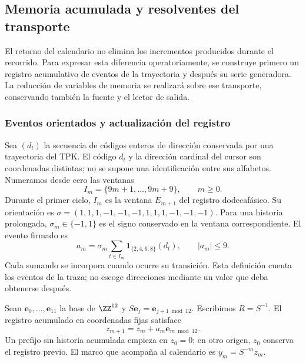 \subsection{Memoria acumulada y resolventes del transporte}
\label{subsec:memoria-resolvente}

El retorno del calendario no elimina los incrementos producidos durante
el recorrido. Para expresar esta diferencia operatoriamente, se construye
primero un registro acumulativo de eventos de la trayectoria y después su
serie generadora. La reducción de variables de memoria se realizará sobre
ese transporte, conservando también la fuente y el lector de salida.

\subsubsection{Eventos orientados y actualización del registro}

Sea \((d_t)\) la secuencia de códigos enteros de dirección conservada
por una trayectoria del TPK. El código \(d_t\) y la dirección cardinal
del cursor son coordenadas distintas; no se supone una identificación
entre sus alfabetos. Numeramos desde cero las ventanas
\[
 I_m=\{9m+1,\ldots,9m+9\},\qquad m\geq0.
\]
Durante el primer ciclo, \(I_m\) es la ventana \(E_{m+1}\) del registro
dodecafásico. Su orientación es
\(\sigma=(1,1,1,-1,-1,-1,1,1,1,-1,-1,-1)\).
Para una historia prolongada, \(\sigma_m\in\{-1,1\}\) es el signo
conservado en la ventana correspondiente. El evento firmado es
\begin{equation}
 a_m=\sigma_m\sum_{t\in I_m}
       \mathbf1_{\{2,4,6,8\}}(d_t),\qquad |a_m|\leq9.
 \label{mem:evento}
\end{equation}
Cada sumando se incorpora cuando ocurre su transición. Esta definición
cuenta los eventos de la traza; no escoge direcciones mediante un valor
que deba obtenerse después.

Sean \(\mathbf e_0,\ldots,\mathbf e_{11}\) la base de \(\ZZ^{12}\)
y \(S\mathbf e_j=\mathbf e_{j+1\bmod12}\). Escribimos
\(R=S^{-1}\). El registro acumulado en coordenadas fijas satisface
\[
z_{m+1}=z_m+a_m\mathbf e_{m\bmod12}.
\]
Un prefijo sin historia acumulada empieza en \(z_0=0\); en otro
origen, \(z_0\) conserva el registro previo.
El marco que acompaña al calendario es \(y_m=S^{-m}z_m\).

